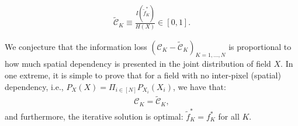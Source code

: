 \begin{align}\label{eq:Meth_Iter_OWP_Ck}
	\mathcal{\tilde{C}}_{K} \equiv \frac{I(\tilde{f}^{*}_{K})}{H(X)} \in [0,1]. 
\end{align}

We conjecture that the information loss $(\mathcal{C}_{K}- \mathcal{\tilde{C}}_{K})_{K=1,\ldots,N} $ is proportional to how much spatial dependency is presented in the joint distribution of field $X$. In one extreme, it is simple to prove that for a field with no inter-pixel (spatial) dependency, i.e., $P_{X}(X)=\Pi_{i \in [N]} P_{X_{ i }}(X_{ i })$, we have that: 
\begin{align}\label{eq:Meth_Iter_OWP_Prop_Ck_Independent}
	\mathcal{C}_{K}= \mathcal{\tilde{C}}_{K}, 
\end{align}
and furthermore, the iterative solution is optimal: $\tilde{f}^{*}_{K}= {f}^{*}_{K}$ for all $K$. %


